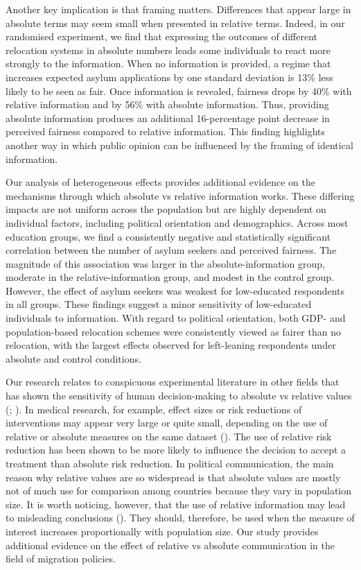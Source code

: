 \documentclass[
  12pt,
  a4paper,
]{article}
\begin{document}
Another key implication is that framing matters. Differences that appear large in absolute terms may seem small when presented in relative terms. Indeed, in our randomised experiment, we find that expressing the outcomes of different relocation systems in absolute numbers leads some individuals to react more strongly to the information. When no information is provided, a regime that increases expected asylum applications by one standard deviation is 13\% less likely to be seen as fair. Once information is revealed, fairness drops by 40\% with relative information and by 56\% with absolute information. Thus, providing absolute information produces an additional 16-percentage point decrease in perceived fairness compared to relative information. This finding highlights another way in which public opinion can be influenced by the framing of identical information.

Our analysis of heterogeneous effects provides additional evidence on the mechanisms through which absolute vs relative information works. These differing impacts are not uniform across the population but are highly dependent on individual factors, including political orientation and demographics. Across most education groups, we find a consistently negative and statistically significant correlation between the number of asylum seekers and perceived fairness. The magnitude of this association was larger in the absolute-information group, moderate in the relative-information group, and modest in the control group. However, the effect of asylum seekers was weakest for low-educated respondents in all groups. These findings suggest a minor sensitivity of low-educated individuals to information. With regard to political orientation, both GDP- and population-based relocation schemes were consistently viewed as fairer than no relocation, with the largest effects observed for left-leaning respondents under absolute and control conditions.

Our research relates to conspicuous experimental literature in other fields that has shown the sensitivity of human decision-making to absolute vs relative values (; ). In medical research, for example, effect sizes or risk reductions of interventions may appear very large or quite small, depending on the use of relative or absolute measures on the same dataset (). The use of relative risk reduction has been shown to be more likely to influence the decision to accept a treatment than absolute risk reduction. In political communication, the main reason why relative values are so widespread is that absolute values are mostly not of much use for comparison among countries because they vary in population size. It is worth noticing, however, that the use of relative information may lead to misleading conclusions (). They should, therefore, be used when the measure of interest increases proportionally with population size. Our study provides additional evidence on the effect of relative vs absolute communication in the field of migration policies.
\end{document}
